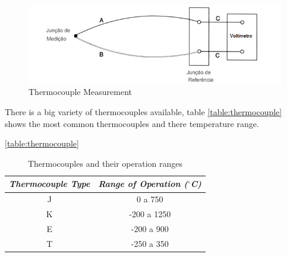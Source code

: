 	\begin{figure}[htbp]
		\centering
			\includegraphics[scale=0.75]{figuras/fig-thermocouple-measurement.jpg}
		\caption{Thermocouple Measurement \cite{termo-med}}
		\label{fig:thermocoupleMeasurement}
	\end{figure}
		
	There is a big variety of thermocouples available, table \ref{table:thermocouple} shows the most common thermocouples and there temperature range.

	\begin{table}[h!]
		\centering
		\caption{Thermocouples and their operation ranges}
		\ref{table:thermocouple}
		\begin{tabular}{|c|c|}
			\hline
			\textit{\textbf{Thermocouple Type}} & \textit{\textbf{Range of Operation ($^{\circ}$C)}} \\ \hline
			J & 0 a 750 \\ \hline
			K & -200 a 1250 \\ \hline
			E & -200 a 900 \\ \hline
			T & -250 a 350 \\ \hline
		\end{tabular}
	\end{table}

